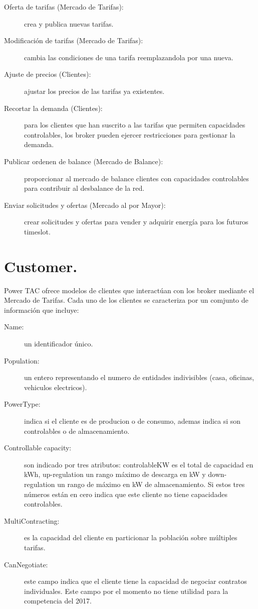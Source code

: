 \begin{description}
	\item [Oferta de tarifas (Mercado de Tarifas):] crea y publica nuevas tarifas.
	\item [Modificación de tarifas (Mercado de Tarifas):]  cambia las condiciones de una tarifa reemplazandola por una nueva.
	\item [Ajuste de precios (Clientes):] ajustar los precios de las tarifas ya existentes.
	\item [Recortar la demanda (Clientes):] para los clientes que han suscrito a las tarifas que permiten capacidades controlables, los broker pueden ejercer restricciones para gestionar la demanda.
	\item [Publicar ordenen de balance (Mercado de Balance):] proporcionar al mercado de balance clientes con capacidades controlables para contribuir al desbalance de la red.
	\item [Enviar solicitudes y ofertas (Mercado al por Mayor):]  crear solicitudes y ofertas para vender y adquirir energía para los futuros timeslot.
\end{description}
\section{Customer.}

Power TAC ofrece modelos de clientes que interactúan con los broker mediante el Mercado de Tarifas. Cada uno de los clientes se caracteriza por un comjunto de información que incluye:

\begin{description}
	\item[Name:] un identificador único.
	\item[Population:] un entero representando el numero de entidades indivisibles (casa, oficinas, vehiculos electricos).
	\item[PowerType:] indica si el cliente es de producion o de consumo, ademas indica si  son controlables o de almacenamiento.
	\item[Controllable capacity:] son indicado por tres atributos: controlableKW  es el total de capacidad en kWh, up-regulation un rango máximo de descarga en kW y down-regulation un rango de máximo en kW de almacenamiento. Si estos tres números están en cero indica que este cliente no tiene capacidades controlables.
	\item[MultiContracting:] es la capacidad del cliente en particionar la población sobre múltiples tarifas.
	\item[CanNegotiate:] este campo indica que el cliente tiene la capacidad de negociar contratos individuales. Este campo por el momento no tiene utilidad para la competencia del 2017.
\end{description}

